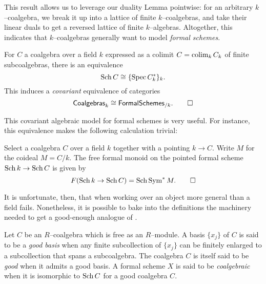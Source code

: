 \noindent This result allows us to leverage our duality Lemma pointwise: for an arbitrary $k$--coalgebra, we break it up into a lattice of finite $k$--coalgebras, and take their linear duals to get a reversed lattice of finite $k$--algebras.  Altogether, this indicates that $k$--coalgebras generally want to model \emph{formal schemes}.

\begin{corollary}\label{CoalgsAndFSchsAgreeOverk}
For $C$ a coalgebra over a field $k$ expressed as a colimit $C = \operatorname*{colim}_k C_k$ of finite subcoalgebras, there is an equivalence \[\operatorname{Sch} C \cong \{\operatorname{Spec} C_k^*\}_k.\]  This induces a \emph{covariant} equivalence of categories \[\mathsf{Coalgebras}_k \cong \mathsf{FormalSchemes}_{/k}. \qed\]
\end{corollary}

This covariant algebraic model for formal schemes is very useful.    For instance, this equivalence makes the following calculation trivial:
\begin{lemma}
Select a coalgebra $C$ over a field $k$ together with a pointing $k \to C$.  Write $M$ for the coideal $M = C / k$.  The free formal monoid on the pointed formal scheme $\operatorname{Sch} k \to \operatorname{Sch} C$ is given by  \[F(\operatorname{Sch} k \to \operatorname{Sch} C) = \operatorname{Sch} \operatorname{Sym}^* M. \qed\]
\end{lemma}

It is unfortunate, then, that when working over an object more general than a field  fails.  Nonetheless, it is possible to bake into the definitions the machinery needed to get a good-enough analogue of .

\begin{definition}\label{DefnCoalgebraicFormalScheme}
Let $C$ be an $R$--coalgebra which is free as an $R$--module.  A basis $\{x_j\}$ of $C$ is said to be a \textit{good basis} when any finite subcollection of $\{x_j\}$ can be finitely enlarged to a subcollection that spans a subcoalgebra.  The coalgebra $C$ is itself said to be \textit{good} when it admits a good basis.  A formal scheme $X$ is said to be \textit{coalgebraic} when it is isomorphic to $\operatorname{Sch} C$ for a good coalgebra $C$.
\end{definition}

